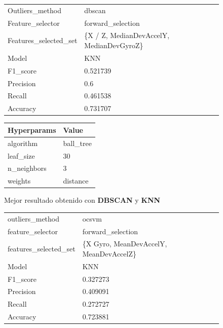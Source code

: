 \begin{appendices}
		\begin{figure}[htb]
			\centering
			\begin{tabular}{ll}
				\toprule
					  Outliers\_method &                                   dbscan \\
					 Feature\_selector &                        forward\_selection \\
				Features\_selected\_set & \{X / Z, MedianDevAccelY, MedianDevGyroZ\} \\
								Model &                                      KNN \\
						F1\_score &                                 0.521739 \\
					   Precision &                                      0.6 \\
						  Recall &                                 0.461538 \\
						Accuracy &                                 0.731707 \\
				\bottomrule
			\end{tabular}
			\newline
			\newline

			\begin{tabular}{ll}
				\toprule
				Hyperparams &     Value \\
				\midrule
				  algorithm & ball\_tree \\
				  leaf\_size &        30 \\
				n\_neighbors &         3 \\
					weights &  distance \\
				\bottomrule
			\end{tabular}
			\caption{Mejor resultado obtenido con \textbf{DBSCAN} y \textbf{KNN}}
			\label{table:19}
		\end{figure}

		\begin{figure}[htb]
			\centering
			\begin{tabular}{ll}
				\toprule
					  outliers\_method &                                  ocsvm \\
					 feature\_selector &                      forward\_selection \\
				features\_selected\_set & \{X Gyro, MeanDevAccelY, MeanDevAccelZ\} \\
								Model &                                    KNN \\
						F1\_score &                               0.327273 \\
					   Precision &                               0.409091 \\
						  Recall &                               0.272727 \\
						Accuracy &                               0.723881 \\
				\bottomrule
			\end{tabular}
			\newline
			\newline


\end{figure}
\end{appendices}
